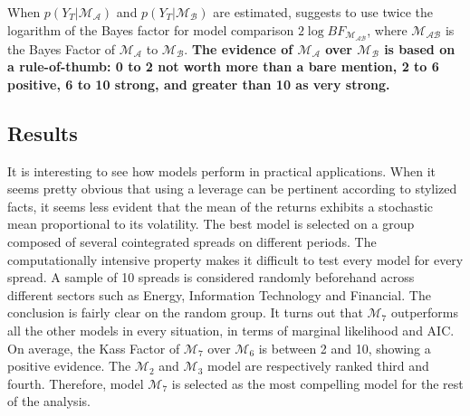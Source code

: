 \documentclass[11pt,a4,twosided,singlespacing,titlepagenumber=on]{scrreprt}
\numberwithin{equation}{chapter} %
\theoremstyle{remark}
\begin{document}
When $p(Y_T | \mathcal{M_A})$ and $p(Y_T | \mathcal{M_B})$ are estimated, \cite{kass1995} suggests to use twice the logarithm of the Bayes factor for model comparison $2 \log BF_{\mathcal{M_{AB}}}$, where $\mathcal{M_{AB}}$ is the Bayes Factor of $\mathcal{M_A}$ to $\mathcal{M_B}$. \textbf{The evidence of $\mathcal{M_A}$ over $\mathcal{M_B}$ is based on a rule-of-thumb: 0 to 2 not worth more than a bare mention, 2 to 6 positive, 6 to 10 strong, and greater than 10 as very strong.}


\subsection{Results}
\label{sec:model_selection}
It is interesting to see how models perform in practical applications. When it seems pretty obvious that using a leverage can be pertinent according to stylized facts, it seems less evident that the mean of the returns exhibits a stochastic mean proportional to its volatility. The best model is selected on a group composed of several cointegrated spreads on different periods. The computationally intensive property makes it difficult to test every model for every spread. A sample of 10 spreads is considered randomly beforehand across different sectors such as Energy, Information Technology and Financial. The conclusion is fairly clear on the random group. It turns out that $\mathcal{M}_7$ outperforms all the other models in every situation, in terms of marginal likelihood and AIC. On average, the Kass Factor of $\mathcal{M}_7$ over $\mathcal{M}_6$ is between 2 and 10, showing a positive evidence. The $\mathcal{M}_2$ and $\mathcal{M}_3$ model are respectively ranked third and fourth. Therefore, model $\mathcal{M}_7$ is selected as the most compelling model for the rest of the analysis. \\
\end{document}
